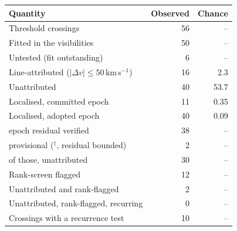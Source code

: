 \begin{tabular}{@{}lrr@{}}
\hline
Quantity & Observed & Chance \\
\hline
Threshold crossings & 56 & -- \\
Fitted in the visibilities & 50 & -- \\
Untested (fit outstanding) & 6 & -- \\
Line-attributed ($|\Delta v|\leq50$\,km\,s$^{-1}$) & 16 & 2.3 \\
Unattributed & 40 & 53.7 \\
Localised, committed epoch & 11 & 0.35 \\
Localised, adopted epoch & 40 & 0.09 \\
\quad epoch residual verified & 38 & -- \\
\quad provisional ($^{\dagger}$, residual bounded) & 2 & -- \\
\quad of those, unattributed & 30 & -- \\
Rank-screen flagged & 12 & -- \\
Unattributed and rank-flagged & 2 & -- \\
Unattributed, rank-flagged, recurring & 0 & -- \\
Crossings with a recurrence test & 10 & -- \\
\hline
\end{tabular}
